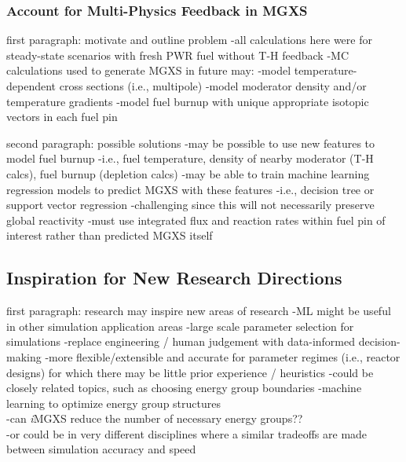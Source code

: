 \subsubsection{Account for Multi-Physics Feedback in MGXS}
\label{subsubsec:chap12-multi-physics-mgxs}

first paragraph: motivate and outline problem
-all calculations here were for steady-state scenarios with fresh \ac{PWR} fuel without T-H feedback
-\ac{MC} calculations used to generate \ac{MGXS} in future may:
  -model temperature-dependent cross sections (i.e., multipole)
  -model moderator density and/or temperature gradients
  -model fuel burnup with unique appropriate isotopic vectors in each fuel pin

second paragraph: possible solutions
-may be possible to use new features to model fuel burnup
  -i.e., fuel temperature, density of nearby moderator (T-H calcs), fuel burnup (depletion calcs)
-may be able to train machine learning regression models to predict \ac{MGXS} with these features
  -i.e., decision tree or support vector regression
  -challenging since this will not necessarily preserve global reactivity
    -must use integrated flux and reaction rates within fuel pin of interest rather than predicted \ac{MGXS} itself


\subsection{Inspiration for New Research Directions}
\label{subsec:chap12-inspiration}

first paragraph: research may inspire new areas of research
-ML might be useful in other simulation application areas
  -large scale parameter selection for simulations
  -replace engineering / human judgement with data-informed decision-making
    -more flexible/extensible and accurate for parameter regimes (i.e., reactor designs) for which there may be little prior experience / heuristics
-could be closely related topics, such as choosing energy group boundaries
  -machine learning to optimize energy group structures \\
    -can \textit{i}MGXS reduce the number of necessary energy groups?? \\
-or could be in very different disciplines where a similar tradeoffs are made between simulation accuracy and speed